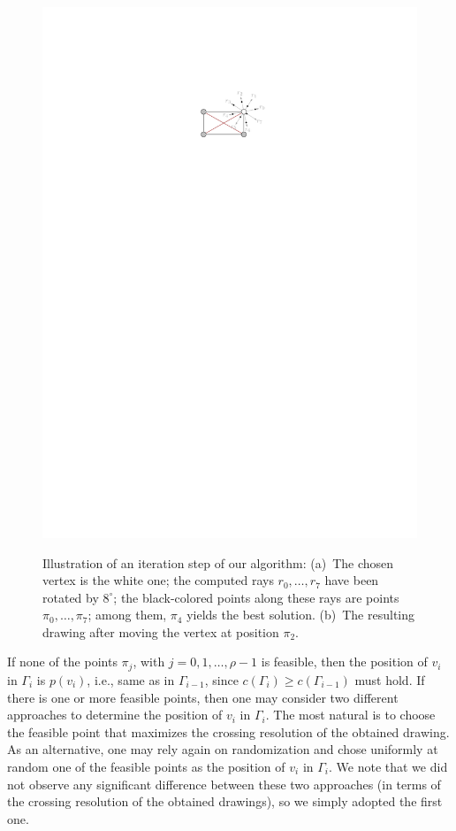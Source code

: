 \documentclass[runningheads]{llncs}
\begin{document}
\begin{figure}[t!]
{	\includegraphics[page=2, scale=0.9]{figures/algorithm}}
	\caption{%
	Illustration of an iteration step of our algorithm:
	(a)~The chosen vertex is the white one;
	the computed rays $r_0,\ldots,r_7$ have been rotated by $8^\circ$;
	the black-colored points along these rays are points $\pi_0,\ldots,\pi_7$;
	among them, $\pi_4$ yields the best solution.
	(b)~The resulting drawing after moving the vertex at position $\pi_2$.}
	\label{fig:algo}
\end{figure}

If none of the points $\pi_j$, with $j=0,1,\ldots,\rho-1$ is feasible, then the position of $v_i$ in $\Gamma_i$ is $p(v_i)$, i.e., same as in $\Gamma_{i-1}$, since $c(\Gamma_i) \geq c(\Gamma_{i-1})$ must hold. If there is one or more feasible points, then one may consider two different approaches to determine the position of $v_i$ in $\Gamma_i$. The most natural is to choose the feasible point that maximizes the crossing resolution of the obtained drawing. As an alternative, one may rely again on randomization and chose uniformly at random one of the feasible points as the position of $v_i$ in $\Gamma_i$. We note that we did not observe any significant difference between these two approaches (in terms of the crossing resolution of the obtained drawings), so we simply adopted the first one.
\end{document}
